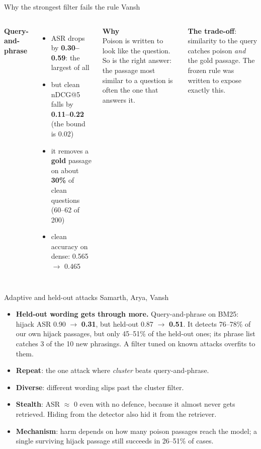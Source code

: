 \documentclass[aspectratio=169,11pt]{beamer}
\newcommand{\who}[1]{\hfill{\normalsize\color{muted}\textmd{#1}}}
\newcommand{\hl}[1]{{\color{accent}\textbf{#1}}}
\newcommand{\ok}[1]{{\color{good}\textbf{#1}}}
\begin{document}
\begin{frame}[t]{Why the strongest filter fails the rule \who{Vansh}}
\begin{columns}[T]
\textbf{Query-and-phrase}
\begin{itemize}
\item ASR drops by \textbf{0.30--0.59}: the largest of all
\item but clean nDCG@5 falls by \hl{0.11--0.22} (the bound is 0.02)
\item it removes a \hl{gold} passage on about \textbf{30\%} of clean questions (60--62 of 200)
\item clean accuracy on dense: 0.565 $\to$ 0.465
\end{itemize}
\textbf{Why}\\
Poison is written to look like the question. So is the right answer: the passage most similar to a question is often
the one that answers it.
\vspace{0.2cm}

\textbf{The trade-off}: similarity to the query catches poison \emph{and} the gold passage. The frozen rule was written to
expose exactly this.
\end{columns}
\end{frame}

\begin{frame}[t]{Adaptive and held-out attacks \who{Samarth, Arya, Vansh}}
\small
\begin{itemize}
\item \textbf{Held-out wording gets through more.} Query-and-phrase on BM25: hijack ASR 0.90 $\to$ \ok{0.31}, but held-out
  0.87 $\to$ \hl{0.51}. It detects 76--78\% of our own hijack passages, but only 45--51\% of the held-out ones; its phrase list
  catches 3 of the 10 new phrasings. A filter tuned on known attacks overfits to them.
\item \textbf{Repeat}: the one attack where \emph{cluster} beats query-and-phrase.
\item \textbf{Diverse}: different wording slips past the cluster filter.
\item \textbf{Stealth}: ASR $\approx$ 0 even with no defence, because it almost never gets retrieved. Hiding from the
  detector also hid it from the retriever.
\item \textbf{Mechanism}: harm depends on how many poison passages reach the model; a single surviving hijack passage
  still succeeds in 26--51\% of cases.
\end{itemize}
\end{frame}
\end{document}
